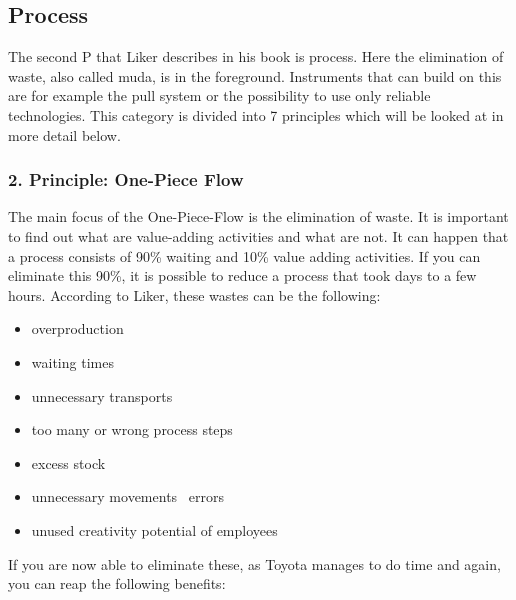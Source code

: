 \documentclass[a4paper,12pt]{scrartcl}
\begin{document}
\clearpage

\subsection{Process}

The second P that Liker describes in his book is process. Here the elimination of waste, also called muda, is in the foreground. Instruments that can build on this are for example the pull system or the possibility to use only reliable technologies. This category is divided into 7 principles which will be looked at in more detail below. 

\subsubsection{2. Principle: One-Piece Flow}

The main focus of the One-Piece-Flow is the elimination of waste. It is important to find out what are value-adding activities and what are not. It can happen that a process consists of 90\% waiting and 10\% value adding activities. If you can eliminate this 90\%, it is possible to reduce a process that took days to a few hours. According to Liker, these wastes can be the following:

\begin{itemize}
    \item overproduction
    \item waiting times
    \item unnecessary transports
    \item too many or wrong process steps
    \item excess stock
    \item unnecessary movements
    \ errors
    \item unused creativity potential of employees
\end{itemize}

If you are now able to eliminate these, as Toyota manages to do time and again, you can reap the following benefits:
\end{document}
